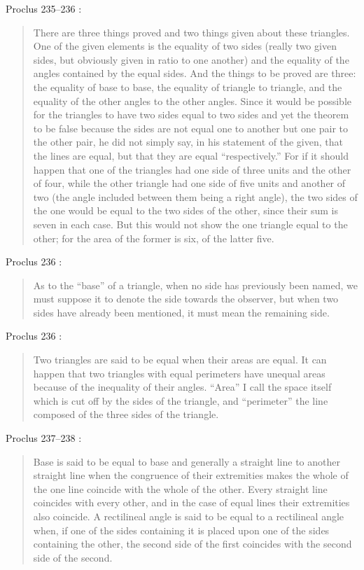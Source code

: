 \documentclass{article}
\begin{document}
Proclus 235--236 \cite[pp.~183--184]{proclus}:

\begin{quote}
There are three things proved and two things given about these triangles. One of the given elements
is the equality of two sides (really two given sides, but obviously given in ratio to one another) and the equality
of the angles contained by the equal sides. And the things to be proved are three: the
equality of  base to base, the equality of triangle to triangle,
and the equality of the other angles to the other angles.
Since it would be possible for the triangles to have two sides 
equal to two sides and yet the theorem to be false because the sides
are not equal one to another but one pair to the other pair,
he did not simply say, in his statement of the given, that
the lines are equal, but that they are equal ``respectively.'' For
if it should happen that one of the triangles had one side of
three units and the other of four, while the other triangle had
one side of five units and another of two (the angle included between them being
a right angle), the two sides of the one 
would be equal to the two sides of the other, since their sum
is seven in each case. But this would not show the one triangle
equal to the other; for the area of the former is six, of the latter five.
\end{quote}

Proclus 236 \cite[p.~184]{proclus}:

\begin{quote}
As to the ``base'' of a triangle, when no side has previously been named,
we must suppose it to denote the side towards the observer, but when two sides have already been mentioned,
it must mean the remaining side.
\end{quote}

Proclus 236 \cite[p.~185]{proclus}:

\begin{quote}
Two triangles are said to be equal when their areas are equal. It can happen that
two triangles with equal perimeters have unequal areas because of the inequality of their
angles. ``Area'' I call the space itself which is cut off by the sides of the triangle,
and ``perimeter'' the line composed of the three sides of the triangle.
\end{quote}

Proclus 237--238 \cite[p.~185]{proclus}:

\begin{quote}
Base is said to be equal to base and generally a straight line
to another straight line when the congruence of their extremities
makes the whole of the one line coincide with the whole
of the other. Every straight line coincides with every other,
and in the case of equal lines their extremities also coincide.
A rectilineal angle is said to be equal to a rectilineal angle when,
if one of the sides containing it is placed upon one of 
the sides containing the other, the second side of the first coincides
with the second side of the second.
\end{quote}
\end{document}
